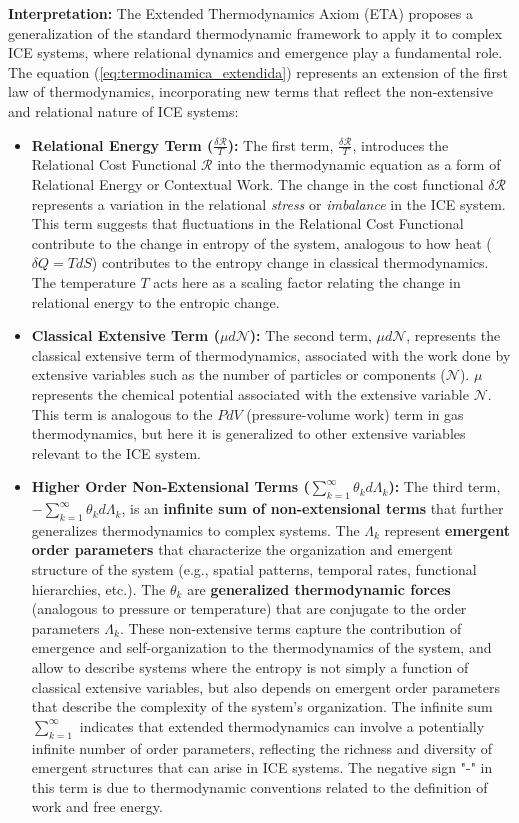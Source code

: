 \documentclass{article}
\begin{document}
\textbf{Interpretation:} The Extended Thermodynamics Axiom (ETA) proposes a generalization of the standard thermodynamic framework to apply it to complex ICE systems, where relational dynamics and emergence play a fundamental role. The equation (\ref{eq:termodinamica_extendida}) represents an extension of the first law of thermodynamics, incorporating new terms that reflect the non-extensive and relational nature of ICE systems:
\begin{itemize}
\item \textbf{Relational Energy Term ($\frac{\delta\mathcal{R}}{T}$):} The first term, $\frac{\delta\mathcal{R}}{T}$, introduces the Relational Cost Functional $\mathcal{R}$ into the thermodynamic equation as a form of Relational Energy or Contextual Work. The change in the cost functional $\delta\mathcal{R}$ represents a variation in the relational \emph{stress} or \emph{imbalance} in the ICE system. This term suggests that fluctuations in the Relational Cost Functional contribute to the change in entropy of the system, analogous to how heat ($\delta Q = T dS$) contributes to the entropy change in classical thermodynamics. The temperature $T$ acts here as a scaling factor relating the change in relational energy to the entropic change.

\item \textbf{Classical Extensive Term ($\mu d\mathcal{N}$):} The second term, $\mu d\mathcal{N}$, represents the classical extensive term of thermodynamics, associated with the work done by extensive variables such as the number of particles or components ($\mathcal{N}$). $\mu$ represents the chemical potential associated with the extensive variable $\mathcal{N}$. This term is analogous to the $PdV$ (pressure-volume work) term in gas thermodynamics, but here it is generalized to other extensive variables relevant to the ICE system.
\item \textbf{Higher Order Non-Extensional Terms ($\sum_{k=1}^\infty \theta_k d\Lambda_k$):} The third term, $-\sum_{k=1}^\infty \theta_k d\Lambda_k$, is an \textbf{infinite sum of non-extensional terms} that further generalizes thermodynamics to complex systems. The $\Lambda_k$ represent \textbf{emergent order parameters} that characterize the organization and emergent structure of the system (e.g., spatial patterns, temporal rates, functional hierarchies, etc.). The $\theta_k$ are \textbf{generalized thermodynamic forces} (analogous to pressure or temperature) that are conjugate to the order parameters $\Lambda_k$.  
These non-extensive terms capture the contribution of emergence and self-organization to the thermodynamics of the system, and allow to describe systems where the entropy is not simply a function of classical extensive variables, but also depends on emergent order parameters that describe the complexity of the system's organization. The infinite sum $\sum_{k=1}^\infty$ indicates that extended thermodynamics can involve a potentially infinite number of order parameters, reflecting the richness and diversity of emergent structures that can arise in ICE systems. The negative sign "-" in this term is due to thermodynamic conventions related to the definition of work and free energy.
\end{itemize}
\end{document}

